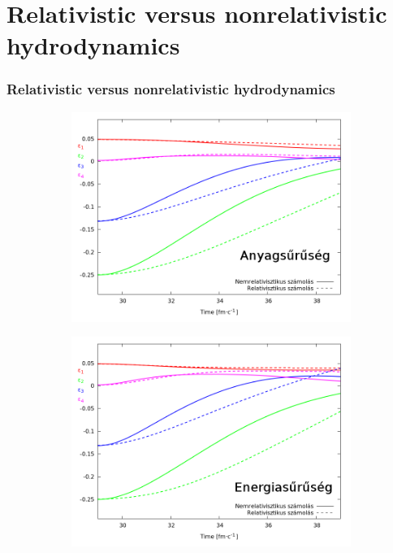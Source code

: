 \documentclass{beamer}
\begin{document}
\section{Relativistic versus nonrelativistic hydrodynamics}
\begin{frame}[noframenumbering]
\frametitle{Relativistic versus nonrelativistic hydrodynamics}
\begin{center}
\begin{figure}[H]
	\centering
    \begin{subfigure}[b]{0.49\textwidth}
    		\includegraphics[width=\textwidth]{pic/res/relnonrel_n}
	\end{subfigure}
	\begin{subfigure}[b]{0.49\textwidth}
        	\includegraphics[width=\textwidth]{pic/res/relnonrel_e}
	\end{subfigure}
\end{figure}
\end{center}
\end{frame}
\end{document}
